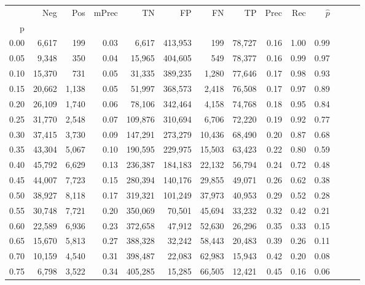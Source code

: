 \begin{tabular}{rrrrrrrrrrrrrr}
\toprule
{} &     Neg &    Pos & mPrec &       TN &       FP &      FN &      TP &  Prec &   Rec & $\hat{p}$ \\
p    &         &        &       &          &          &         &         &       &       &           \\
\midrule
0.00 &   6,617 &    199 &  0.03 &    6,617 &  413,953 &     199 &  78,727 &  0.16 &  1.00 &      0.99 \\
0.05 &   9,348 &    350 &  0.04 &   15,965 &  404,605 &     549 &  78,377 &  0.16 &  0.99 &      0.97 \\
0.10 &  15,370 &    731 &  0.05 &   31,335 &  389,235 &   1,280 &  77,646 &  0.17 &  0.98 &      0.93 \\
0.15 &  20,662 &  1,138 &  0.05 &   51,997 &  368,573 &   2,418 &  76,508 &  0.17 &  0.97 &      0.89 \\
0.20 &  26,109 &  1,740 &  0.06 &   78,106 &  342,464 &   4,158 &  74,768 &  0.18 &  0.95 &      0.84 \\
0.25 &  31,770 &  2,548 &  0.07 &  109,876 &  310,694 &   6,706 &  72,220 &  0.19 &  0.92 &      0.77 \\
0.30 &  37,415 &  3,730 &  0.09 &  147,291 &  273,279 &  10,436 &  68,490 &  0.20 &  0.87 &      0.68 \\
0.35 &  43,304 &  5,067 &  0.10 &  190,595 &  229,975 &  15,503 &  63,423 &  0.22 &  0.80 &      0.59 \\
0.40 &  45,792 &  6,629 &  0.13 &  236,387 &  184,183 &  22,132 &  56,794 &  0.24 &  0.72 &      0.48 \\
0.45 &  44,007 &  7,723 &  0.15 &  280,394 &  140,176 &  29,855 &  49,071 &  0.26 &  0.62 &      0.38 \\
0.50 &  38,927 &  8,118 &  0.17 &  319,321 &  101,249 &  37,973 &  40,953 &  0.29 &  0.52 &      0.28 \\
0.55 &  30,748 &  7,721 &  0.20 &  350,069 &   70,501 &  45,694 &  33,232 &  0.32 &  0.42 &      0.21 \\
0.60 &  22,589 &  6,936 &  0.23 &  372,658 &   47,912 &  52,630 &  26,296 &  0.35 &  0.33 &      0.15 \\
0.65 &  15,670 &  5,813 &  0.27 &  388,328 &   32,242 &  58,443 &  20,483 &  0.39 &  0.26 &      0.11 \\
0.70 &  10,159 &  4,540 &  0.31 &  398,487 &   22,083 &  62,983 &  15,943 &  0.42 &  0.20 &      0.08 \\
0.75 &   6,798 &  3,522 &  0.34 &  405,285 &   15,285 &  66,505 &  12,421 &  0.45 &  0.16 &      0.06 \\

\end{tabular}
